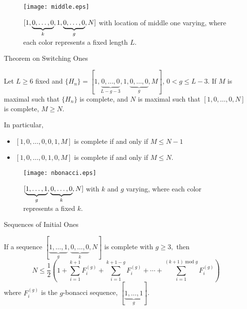 \documentclass[handout]{beamer}
\DeclareMathOperator{\nsmod}{mod}
\newcommand{\nospacemod}[1]{\nsmod#1}
\begin{document}
\begin{frame}{}
    
    \begin{figure}
    \centering
    \texttt{[image: middle.eps]}
    \caption{$[\protect1,\underbrace{0, \dots, 0}_{k},1, \protect\underbrace{0, \dots, 0}_{g}, N]$ with location of middle one varying, where each color represents a fixed length $L$.}
    \label{fig:MiddleOne}
\end{figure}
\end{frame}

\begin{frame}{Theorem on Switching Ones}
\begin{theorem}[SMALL 2020]
Let $L \geq 6$ fixed and $\{ H_n\}= [1,\underbrace{0,\dots,0}_{L-g-3} ,1, \underbrace{0,\ldots,0}_{g},M]$,  $0 < g \le L-3$. If $M$ is maximal such that $\{H_n\}$ is complete, and $N$ is maximal such that 
$[1,0,\dots,0,N]$ is complete, $M\geq N$.

In particular,
\begin{itemize}
    \item $[1, 0, \dots, 0, 0, 1, M]$ is complete if and only if $M \le N-1$
    \item $[1, 0, \dots, 0, 1, 0, M]$ is complete if and only if $M \le N$.
\end{itemize}
\end{theorem}
\end{frame}

\begin{frame}{}
    \begin{figure}
    \centering
    \texttt{[image: nbonacci.eps]}
    \caption{$[\protect\underbrace{1, \dots, 1}_{g}, \protect\underbrace{0, \dots, 0}_{k}, N]$ with $k$ and $g$ varying, where each color represents a fixed $k$.}
    \label{fig:FamiliesOfOne}
\end{figure}
\end{frame}

\begin{frame}{
    Sequences of Initial Ones}
\begin{theorem}[SMALL 2020]
If a sequence $[\underbrace{1,\ldots,1}_g,\underbrace{0,\ldots,0}_k,N]$ is complete with $g\geq 3,$ then
\[{N \leq \frac{1}{2} \left( 1 + \sum\limits_{i = 1}^{k + 1}F_i^{(g)} + \sum\limits_{i = 1}^{k + 1 - g}F^{(g)}_{i} + \cdots + \sum\limits_{i = 1}^{(k + 1)\nospacemod{g}}F^{(g)}_{i} \right)}\]
where $F_{i}^{(g)}$ is the $g$-bonacci sequence, $[\underbrace{1,\ldots,1}_g]$.
\end{theorem}
\end{frame}
\end{document}
